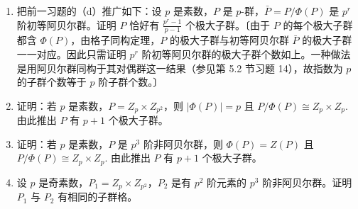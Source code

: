 \begin{enumerate}
（c）设由（a）\(\bar{P}\) 是 \(p^r\) 阶初等阿贝尔群。由习题 24 推出：若 \(x_1, x_2, \ldots, x_r\) 是 \(r\) 维向量空间 \(\bar{P}\)（在 \(\mathbb{F}_p\) 上）的任意基，\(\bar{x}_i\) 是陪集 \(x_i + \Phi(P)\) 的任意元素，则 \(P = \langle x_1, \ldots, x_r \rangle\). 反之证明：若 \(y_1, y_2, \ldots, y_s\) 是 \(P\) 的任意生成元组，则 \(s \geq r\)（你可以假设 \(r\) 维向量空间的每个极小生成元组都有 \(r\) 个元素，即每个基都有 \(r\) 个元素）。由此推出\textbf{伯恩赛德基定理}：\(y_1, \ldots, y_s\) 是 \(P\) 的极小生成元组当且仅当 \(\bar{y}_1, \ldots, \bar{y}_s\) 是 \(\bar{P} = P/\Phi(P)\) 的基。由此推出 \(P\) 的任意极小生成元组都有 \(r\) 个元素。

（d）证明：若 \(P/\Phi(P)\) 循环，则 \(P\) 循环。由此推出：若 \(P/P'\) 循环，则 \(P\) 也循环。

（e）设 \(\sigma\) 是 \(P\) 的任意 \(q\) 阶自同构（\(q \neq p\)，\(q\) 为素数）。证明：若 \(\sigma\) 固定陪集 \(x\Phi(P)\)，则 \(\sigma\) 固定这个陪集中的某个元素（注意由于 \(\Phi(P)\) 在 \(P\) 中特征，\(P\) 的每个自同构都诱导 \(P/\Phi(P)\) 的一个自同构）。〔用 \(\sigma\) 作为陪集 \(x\Phi(P)\) 中 \(p^a\) 个元素上的 1 阶或 \(q\) 阶置换这一观察。〕

（f）用（e）和（c）推出：\(P\) 的每个与 \(p\) 互素的素数阶非平凡自同构都诱导 \(P/\Phi(P)\) 上的非平凡自同构。由此推出：\(P\) 的阶与 \(p\) 互素的任一自同构群都同构于 \(\operatorname{Aut}(\bar{P}) = GL_r(\mathbb{F}_p)\) 的一个子群。

\item 把前一习题的（d）推广如下：设 \(p\) 是素数，\(P\) 是 \(p\)-群，\(\bar{P} = P/\Phi(P)\) 是 \(p^r\) 阶初等阿贝尔群。证明 \(P\) 恰好有 \(\frac{p^r-1}{p-1}\) 个极大子群。〔由于 \(P\) 的每个极大子群都含 \(\Phi(P)\)，由格子同构定理，\(P\) 的极大子群与初等阿贝尔群 \(\bar{P}\) 的极大子群一一对应。因此只需证明 \(p^r\) 阶初等阿贝尔群的极大子群个数如上。一种做法是用阿贝尔群同构于其对偶群这一结果（参见第 5.2 节习题 14），故指数为 \(p\) 的子群个数等于 \(p\) 阶子群个数。〕

\item 证明：若 \(p\) 是素数，\(P = Z_p \times Z_{p^2}\)，则 \(|\Phi(P)| = p\) 且 \(P/\Phi(P) \cong Z_p \times Z_p\). 由此推出 \(P\) 有 \(p+1\) 个极大子群。

\item 证明：若 \(p\) 是素数，\(P\) 是 \(p^3\) 阶非阿贝尔群，则 \(\Phi(P) = Z(P)\) 且 \(P/\Phi(P) \cong Z_p \times Z_p\). 由此推出 \(P\) 有 \(p+1\) 个极大子群。

\item 设 \(p\) 是奇素数，\(P_1 = Z_p \times Z_{p^2}\)，\(P_2\) 是有 \(p^2\) 阶元素的 \(p^3\) 阶非阿贝尔群。证明 \(P_1\) 与 \(P_2\) 有相同的子群格。


\end{enumerate}
